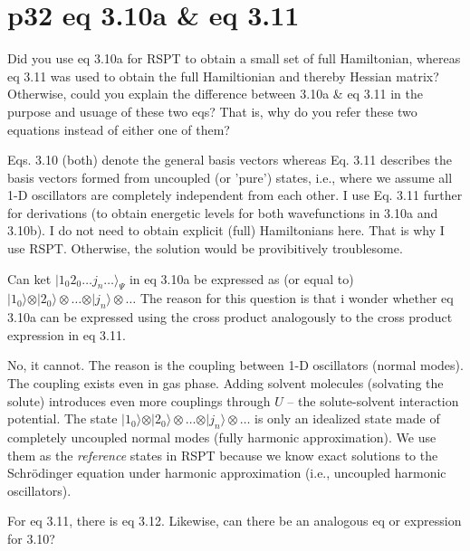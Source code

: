 \documentclass{exam}
\begin{document}
\section{p32 eq 3.10a \& eq 3.11}
\begin{questions}

%
\question Did you use eq 3.10a for RSPT to obtain a small set of full Hamiltonian, whereas eq 3.11 was used to obtain 
the full Hamiltionian and thereby Hessian matrix? Otherwise, could you explain the difference between 3.10a \& eq 3.11 
in the purpose and usuage of these two eqs? That is, why do you refer these two equations instead of either one of them?

\begin{solution}
Eqs. 3.10 (both) denote the general basis vectors whereas Eq. 3.11 describes the basis vectors formed from
uncoupled (or 'pure') states, i.e., where we assume all 1-D oscillators are completely independent from each other.
I use Eq. 3.11 further for derivations (to obtain energetic levels for both wavefunctions in 3.10a and 3.10b). 
I do not need to obtain explicit (full) Hamiltonians here. That is why I use RSPT. Otherwise, 
the solution would be provibitively troublesome.
\end{solution}

%
\question Can ket $\vert 1_0 2_0 \ldots j_n \ldots \rangle_{\Psi}$ in eq 3.10a be expressed as (or equal to) 
$\vert 1_0 \rangle \otimes \vert 2_0 \rangle \otimes \ldots \otimes \vert j_n \rangle \otimes \ldots$
The reason for this question is that i wonder whether eq 3.10a can be expressed using the cross product 
analogously to the cross product expression in eq 3.11.

\begin{solution}
No, it cannot. The reason is the coupling between 1-D oscillators (normal modes). The coupling exists even in gas phase.
Adding solvent molecules (solvating the solute) introduces even more couplings through $U$ -- the solute-solvent interaction potential.
The state $\vert 1_0 \rangle \otimes \vert 2_0 \rangle \otimes \ldots \otimes \vert j_n \rangle \otimes \ldots$ 
is only an idealized state made of completely uncoupled normal modes (fully harmonic approximation). We use them as the \emph{reference}
states in RSPT because we know exact solutions to the Schr{\"o}dinger equation under harmonic approximation 
(i.e., uncoupled harmonic oscillators).
\end{solution}

%
\question For eq 3.11, there is eq 3.12. Likewise, can there be an analogous eq or expression for 3.10?


\end{questions}
\end{document}
